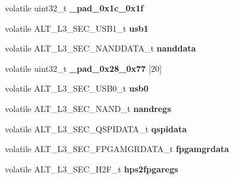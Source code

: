 \begin{DoxyCompactItemize}
\mbox{\label{structALT__L3__SECGRP__s_a14e29fabae078c04150c48e1a606f48c}} 
volatile uint32\+\_\+t {\bfseries \+\_\+pad\+\_\+0x1c\+\_\+0x1f}
\item 
\mbox{\label{structALT__L3__SECGRP__s_a1cdf49764efce0ec2ef94362aa3afe65}} 
volatile A\+L\+T\+\_\+\+L3\+\_\+\+S\+E\+C\+\_\+\+U\+S\+B1\+\_\+t {\bfseries usb1}
\item 
\mbox{\label{structALT__L3__SECGRP__s_a109c4f8035d9b5d02d9e06d8946bb492}} 
volatile A\+L\+T\+\_\+\+L3\+\_\+\+S\+E\+C\+\_\+\+N\+A\+N\+D\+D\+A\+T\+A\+\_\+t {\bfseries nanddata}
\item 
\mbox{\label{structALT__L3__SECGRP__s_abf06664d2991b33baa448396aae9edd5}} 
volatile uint32\+\_\+t {\bfseries \+\_\+pad\+\_\+0x28\+\_\+0x77} \mbox{[}20\mbox{]}
\item 
\mbox{\label{structALT__L3__SECGRP__s_aa09e926fce91e5683f82ea2b06e15efc}} 
volatile A\+L\+T\+\_\+\+L3\+\_\+\+S\+E\+C\+\_\+\+U\+S\+B0\+\_\+t {\bfseries usb0}
\item 
\mbox{\label{structALT__L3__SECGRP__s_aeb4dc57cf98098895c1cdcce2b7e66c2}} 
volatile A\+L\+T\+\_\+\+L3\+\_\+\+S\+E\+C\+\_\+\+N\+A\+N\+D\+\_\+t {\bfseries nandregs}
\item 
\mbox{\label{structALT__L3__SECGRP__s_ae736da5bda30adb1041f44d7db61029f}} 
volatile A\+L\+T\+\_\+\+L3\+\_\+\+S\+E\+C\+\_\+\+Q\+S\+P\+I\+D\+A\+T\+A\+\_\+t {\bfseries qspidata}
\item 
\mbox{\label{structALT__L3__SECGRP__s_abb34c69e391513a07a96f77f800307e5}} 
volatile A\+L\+T\+\_\+\+L3\+\_\+\+S\+E\+C\+\_\+\+F\+P\+G\+A\+M\+G\+R\+D\+A\+T\+A\+\_\+t {\bfseries fpgamgrdata}
\item 
\mbox{\label{structALT__L3__SECGRP__s_ac36aef8639160e802d9664b102982e42}} 
volatile A\+L\+T\+\_\+\+L3\+\_\+\+S\+E\+C\+\_\+\+H2\+F\+\_\+t {\bfseries hps2fpgaregs}
\item 
\mbox{\label{structALT__L3__SECGRP__s_ab9b23869158da8e96c47954359bcfb77}} 

\end{DoxyCompactItemize}
